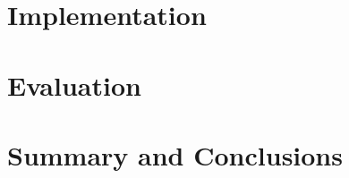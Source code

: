 \documentclass[
	12pt,
	a4paper,
	BCOR10mm,
	DIV14,
	headsepline,
]{scrreprt}
\begin{document}
\chapter{Implementation}
\label{c:impl}

\chapter{Evaluation}
\label{c:eval}

\chapter{Summary and Conclusions}
\label{c:sac}

%
%
%
%
%
%
%
%
\end{document}

